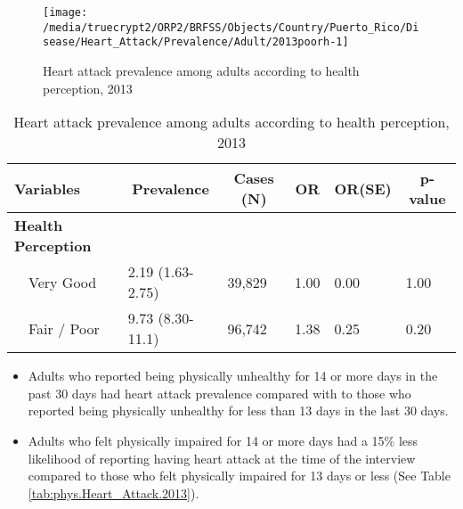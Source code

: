 \begin{figure}[H]
\caption{Heart attack prevalence among adults according to health perception,
         2013}
\label{fig:fairpoor.Heart_Attack.2013}

\begin{knitrout}
\color{fgcolor}

{\centering \texttt{[image: /media/truecrypt2/ORP2/BRFSS/Objects/Country/Puerto\_Rico/Disease/Heart\_Attack/Prevalence/Adult/2013poorh-1]} 

}



\end{knitrout}
 \end{figure}

\begin{table}[H]
\caption{Heart attack prevalence among adults according to health perception, 2013 \label{tab:fairpoor.Heart_Attack.2013}} 
\begin{center}
\begin{tabular}{llllll}
\hline\hline
\multicolumn{1}{l}{Variables}&\multicolumn{1}{c}{Prevalence}&\multicolumn{1}{c}{Cases (N)}&\multicolumn{1}{c}{OR}&\multicolumn{1}{c}{OR(SE)}&\multicolumn{1}{c}{p-value}\tabularnewline
\hline
{\bfseries Health Perception}&&&&&\tabularnewline
~~Very Good&2.19 (1.63-2.75)&39,829&1.00&0.00&1.00\tabularnewline
~~Fair / Poor&9.73 (8.30-11.1)&96,742&1.38&0.25&0.20\tabularnewline
\hline
\end{tabular}\end{center}

\end{table}

 
\newpage

 \newpage
\begin{itemize}

\item Adults who reported being physically unhealthy for 14 or more days in the past 30 days had
 heart attack prevalence compared with to those who reported being physically unhealthy for less than 13 days in the last 30 days.


\item Adults who felt physically impaired for 14 or more days had a 15\% less likelihood of reporting having heart attack at the time of the interview compared to those who felt physically impaired for 13 days or less (See Table \ref{tab:phys.Heart_Attack.2013}).

\end{itemize}

